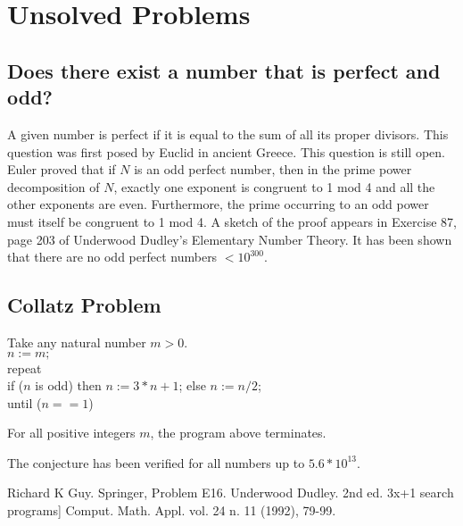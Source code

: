 \section{Unsolved Problems}

\subsection{Does there exist a number that is perfect and odd?}

    A given number is perfect if it is equal to the sum of all its proper
    divisors. This question was first posed by Euclid in ancient Greece.
    This question is still open.  Euler proved that if  $N$  is an odd
    perfect number, then in the prime power decomposition of $N$, exactly
    one exponent is congruent to 1 mod 4 and all the other exponents are
    even. Furthermore, the prime occurring to an odd power must itself be
    congruent to 1 mod 4.  A sketch of the proof appears in Exercise 87,
    page 203 of Underwood Dudley's Elementary Number Theory.
    It has been shown that there are no odd perfect numbers $< 10^{300}$.


\subsection{Collatz Problem}


       Take any natural number $m > 0$.\\
       $n:=m;$\\
       repeat\\
             \hspace{1cm}  if ($n$ is odd) then $n:=3*n+1$; else $n:=n/2$;\\
       until ($n==1$)\\

\begin{conj}  For all positive integers $m$, the program above terminates.
\end{conj}

The conjecture has been verified for all numbers up to $5.6 * 10^{13}$.



\Ref


     {Richard K Guy.}
     {Springer, Problem E16.}
     {Underwood Dudley.}
     {2nd ed.}
 {3x+1 search programs}]
 {Comput. Math. Appl.}
{vol. 24 n. 11 (1992), 79-99.}


